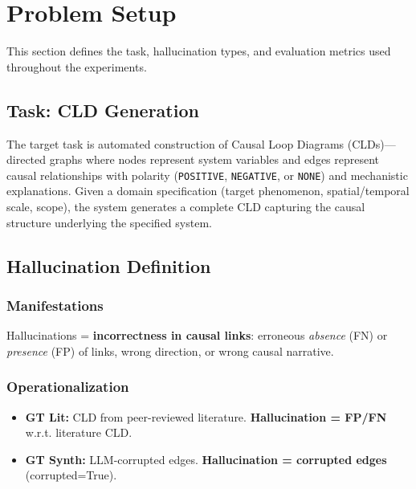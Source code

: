 \section{Problem Setup}
\label{sec:problem_setup}

This section defines the task, hallucination types, and evaluation metrics used throughout the experiments.

\subsection{Task: CLD Generation}
\label{sec:task_cld_generation}

The target task is automated construction of Causal Loop Diagrams (CLDs)---directed graphs where nodes represent system variables and edges represent causal relationships with polarity (\texttt{POSITIVE}, \texttt{NEGATIVE}, or \texttt{NONE}) and mechanistic explanations. Given a domain specification (target phenomenon, spatial/temporal scale, scope), the system generates a complete CLD capturing the causal structure underlying the specified system.

\subsection{Hallucination Definition}
\label{sec:hallucination_definition}

\subsubsection{Manifestations}
Hallucinations = \textbf{incorrectness in causal links}: erroneous \textit{absence} (FN) or \textit{presence} (FP) of links, wrong direction, or wrong causal narrative.

\subsubsection{Operationalization}
\begin{itemize}[noitemsep]
    \item \textbf{GT Lit:} CLD from peer-reviewed literature. \textbf{Hallucination = FP/FN} w.r.t. literature CLD.
    \item \textbf{GT Synth:} LLM-corrupted edges. \textbf{Hallucination = corrupted edges} (corrupted=True).
\end{itemize}

